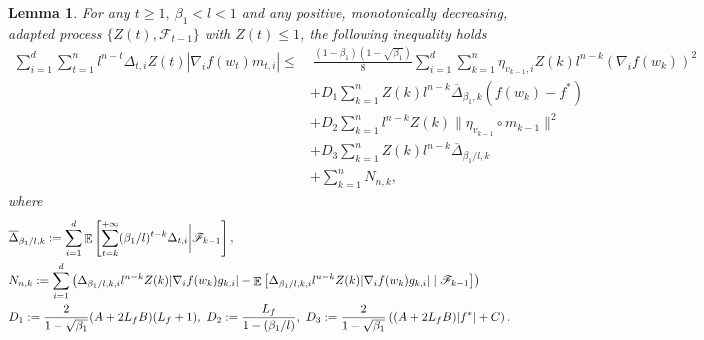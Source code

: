\documentclass{article} %
\newtheorem{lemma}{Lemma}[section]
\DeclareMathOperator{\Expect}{\mathbb{E}}
\begin{document}
\begin{lemma}\label{property_3.510}
For any \( t \geq 1,\ \beta_{1}< l<1 \) and any positive, monotonically decreasing, adapted process \(\{Z(t), \mathscr{F}_{t-1}\}\) with \( Z(t)\le 1 \), the following inequality holds
\begin{align*}
\sum_{i=1}^{d}\sum_{t=1}^{n}l^{n-t}\Delta_{t,i}Z(t)|\nabla_{i} f(w_{t})m_{t,i}|\le &\ \frac{(1-\beta_{1})(1-\sqrt{\beta_{1}})}{8}\sum_{i=1}^{d}\sum_{k=1}^{n}\eta_{v_{k-1},i}Z(k)l^{n-k}(\nabla_{i}f(w_{k}))^{2}\\&+D_{1}\sum_{k=1}^{n}Z(k)l^{n-k}\overline{\Delta}_{\beta_{1},k}(f(w_{k})-f^*)\\&+D_{2}\sum_{k=1}^{n}l^{n-k}Z(k)\|\eta_{v_{k-1}}\circ m_{k-1}\|^{2}\\&+D_{3}\sum_{k=1}^{n}Z(k)l^{n-k}\overline{\Delta}_{\beta_{1}/l,k}\\&+\sum_{k=1}^{n}N_{n,k},
\end{align*}
where
\begin{align}\label{pawefda}
&\overline{\Delta}_{\beta_{1}/l,k} := \sum_{i=1}^{d}\Expect\left[\sum_{t=k}^{+\infty} (\beta_{1}/l)^{t-k} \Delta_{t,i}\bigg|\mathscr{F}_{k-1}\right],\notag \\
&N_{n,k} := \sum_{i=1}^{d} \left(\Delta_{\beta_{1}/l,k,i} l^{n-k} Z(k) |\nabla_{i} f(w_{k}) g_{k,i}|  - \Expect\left[\Delta_{\beta_{1}/l,k,i} l^{n-k} Z(k) |\nabla_{i} f(w_{k}) g_{k,i}| \mid \mathscr{F}_{k-1}\right]\right)\notag\\&D_{1}:=\frac{2}{1-\sqrt{\beta_{1}}}(A+2L_{f}B)(L_{f}+1),\ D_{2}:=\frac{L_{f}}{1-(\beta_{1}/l)},\ D_{3}:=\frac{2}{1-\sqrt{\beta_{1}}}\left((A+2L_{f}B)|f^*|+C\right).
\end{align}

\end{lemma}
\end{document}
